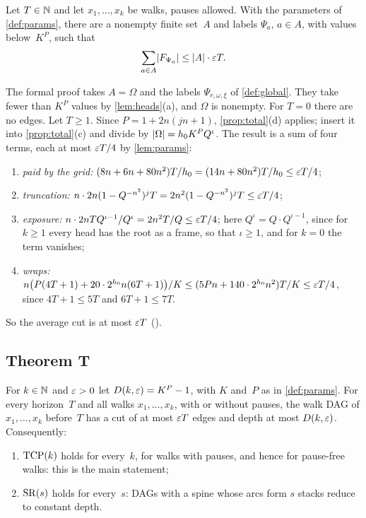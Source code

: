 \begin{proposition}\label{prop:mainest}
Let $T\in\mathbb{N}$ and let $x_1,\dots,x_k$ be walks, pauses allowed. With the parameters of \cref{def:params}, there are a nonempty
finite set~$A$ and labels $\Psi_a$, $a\in A$, with values below~$K^P$, such that
\[
  \sum_{a\in A}\lvert F_{\Psi_a} \rvert\le\lvert A \rvert\cdot\varepsilon T .
\]
\end{proposition}

\begin{outline}
The formal proof takes $A=\Omega$ and the labels $\Psi_{r,\omega,\xi}$ of \cref{def:global}. They take fewer than $K^P$ values by
\cref{lem:heads}(a), and $\Omega$ is nonempty. For $T=0$ there are no edges. Let
$T\ge1$. Since $P=1+2n(jn+1)$, \cref{prop:total}(d) applies; insert it into \cref{prop:total}(c) and divide by
$\lvert \Omega \rvert=h_0K^PQ^\iota$. The result is a sum of four terms, each at most $\varepsilon T/4$ by \cref{lem:params}:
\begin{enumerate}[label=(\roman*)]
\item \emph{paid by the grid:} $(8n+6n+80n^2)T/h_0=(14n+80n^2)T/h_0\le\varepsilon T/4$;
\item \emph{truncation:} $n\cdot2n(1-Q^{-n^2})^jT=2n^2(1-Q^{-n^2})^jT\le\varepsilon T/4$;
\item \emph{exposure:} $n\cdot2nTQ^{\iota-1}/Q^\iota=2n^2T/Q\le\varepsilon T/4$; here $Q^\iota=Q\cdot Q^{\iota-1}$, since for $k\ge1$ every
head has the root as a frame, so that $\iota\ge1$, and for $k=0$ the term vanishes;
\item \emph{wraps:} $n\bigl(P(4T+1)+20\cdot2^{h_0}n(6T+1)\bigr)/K\le(5Pn+140\cdot2^{h_0}n^2)T/K\le\varepsilon T/4$, since $4T+1\le5T$ and
$6T+1\le7T$.
\end{enumerate}
So the average cut is at most $\varepsilon T$ ().
\end{outline}

\subsection{Theorem T}\label{sec:proof-T}

\begin{theorem}[Theorem T]\label{thm:T}
For $k\in\mathbb{N}$ and $\varepsilon>0$ let $D(k,\varepsilon)=K^P-1$, with $K$ and~$P$ as in \cref{def:params}. For every horizon~$T$ and all walks
$x_1,\dots,x_k$, with or without pauses, the walk DAG of $x_1,\dots,x_k$ before~$T$ has a cut of at most $\varepsilon T$ edges and depth
at most $D(k,\varepsilon)$. Consequently:
\begin{enumerate}[label=(\alph*)]
\item $\mathrm{TCP}(k)$ holds for every~$k$, for walks with pauses, and hence for pause-free walks: this is the main statement;
\item $\mathrm{SR}(s)$ holds for every~$s$: DAGs with a spine whose arcs form $s$ stacks reduce to constant depth.
\end{enumerate}
\end{theorem}

